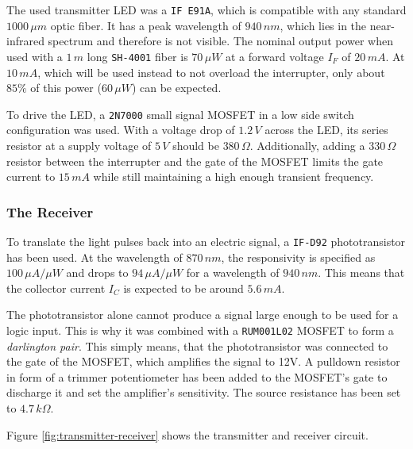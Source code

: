 The used transmitter LED was a \texttt{IF E91A}, which is compatible with any standard \(1000\,\mu m\) optic fiber. It has a peak wavelength of \(940\,nm\), which lies in the near-infrared spectrum and therefore is not visible. The nominal output power when used with a \(1\,m\) long \texttt{SH-4001} fiber is \(70\,\mu W\) at a forward voltage \(I_F\) of \(20\,mA\). At \(10\,mA\), which will be used instead to not overload the interrupter, only about \(85\%\) of this power (\(60\,\mu W\)) can be expected.

To drive the LED, a \texttt{2N7000} small signal MOSFET in a low side switch configuration was used. With a voltage drop of \(1.2\,V\) across the LED, its series resistor at a supply voltage of \(5\,V\) should be \(380\,\Omega\). Additionally, adding a \(330\,\Omega\) resistor between the interrupter and the gate of the MOSFET limits the gate current to \(15\,mA\) while still maintaining a high enough transient frequency.

\subsubsection{The Receiver}

To translate the light pulses back into an electric signal, a \texttt{IF-D92} phototransistor has been used. At the wavelength of \(870\,nm\), the responsivity is specified as \(100\,\mu A/\mu W\) and drops to \(94\,\mu A/\mu W\) for a wavelength of \(940\,nm\). This means that the collector current \(I_C\) is expected to be around \(5.6\,mA\).

The phototransistor alone cannot produce a signal large enough to be used for a logic input. This is why it was combined with a \texttt{RUM001L02} MOSFET to form a \emph{darlington pair}. This simply means, that the phototransistor was connected to the gate of the MOSFET, which amplifies the signal to 12V. A pulldown resistor in form of a trimmer potentiometer has been added to the MOSFET's gate to discharge it and set the amplifier's sensitivity. The source resistance has been set to \(4.7\,k\Omega\).

Figure \ref{fig:transmitter-receiver} shows the transmitter and receiver circuit.

